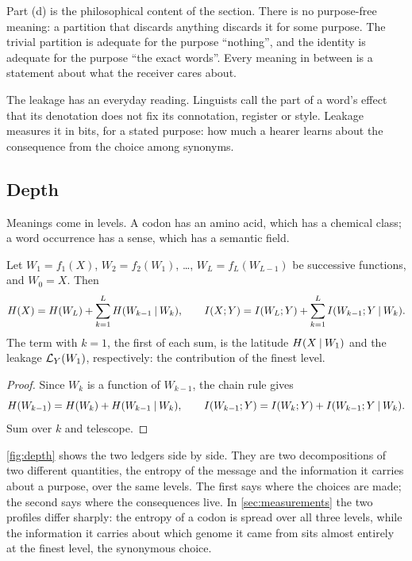 Part (d) is the philosophical content of the section. There is no purpose-free meaning: a partition that discards anything discards it for some purpose. The trivial partition is adequate for the purpose ``nothing'', and the identity is adequate for the purpose ``the exact words''. Every meaning in between is a statement about what the receiver cares about.

The leakage has an everyday reading. Linguists call the part of a word's effect that its denotation does not fix its connotation, register or style. Leakage measures it in bits, for a stated purpose: how much a hearer learns about the consequence from the choice among synonyms.

\subsection{Depth}
Meanings come in levels. A codon has an amino acid, which has a chemical class; a word occurrence has a sense, which has a semantic field.
\begin{proposition}\label{prop:depth}
Let $W_1=f_1(X)$, $W_2=f_2(W_1)$, \dots, $W_L=f_L(W_{L-1})$ be successive functions, and $W_0=X$. Then
\begin{equation}
H(X)=H(W_L)+\sum_{k=1}^{L}H(W_{k-1}\mathbin{\vert} W_k),\qquad
I(X;Y)=I(W_L;Y)+\sum_{k=1}^{L}I(W_{k-1};Y\mathbin{\vert} W_k).
\end{equation}
The term with $k=1$, the first of each sum, is the latitude $H(X\mathbin{\vert} W_1)$ and the leakage $\mathcal{L}_Y(W_1)$, respectively: the contribution of the finest level.
\end{proposition}
\begin{proof}
Since $W_k$ is a function of $W_{k-1}$, the chain rule gives
\[ H(W_{k-1})=H(W_k)+H(W_{k-1}\mathbin{\vert} W_k),\qquad I(W_{k-1};Y)=I(W_k;Y)+I(W_{k-1};Y\mathbin{\vert} W_k). \]
Sum over $k$ and telescope.
\end{proof}
\cref{fig:depth} shows the two ledgers side by side. They are two decompositions of two different quantities, the entropy of the message and the information it carries about a purpose, over the same levels. The first says where the choices are made; the second says where the consequences live. In \cref{sec:measurements} the two profiles differ sharply: the entropy of a codon is spread over all three levels, while the information it carries about which genome it came from sits almost entirely at the finest level, the synonymous choice.

